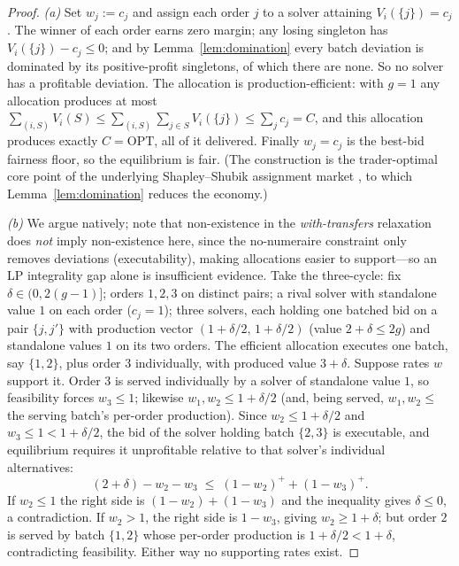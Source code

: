 \documentclass[11pt]{article}
\theoremstyle{remark}
\newcommand{\OPT}{\mathrm{OPT}}
\begin{document}
\begin{proof}
\emph{(a)} Set $w_j:=c_j$ and assign each order $j$ to a solver attaining
$V_i(\{j\})=c_j$. The winner of each order earns zero margin; any
losing singleton has $V_i(\{j\})-c_j\le0$; and by
Lemma~\ref{lem:domination} every batch deviation is dominated by its
positive-profit singletons, of which there are none. So no solver has a
profitable deviation. The allocation is production-efficient: with $g=1$
any allocation produces at most
$\sum_{(i,S)}V_i(S)\le\sum_{(i,S)}\sum_{j\in S}V_i(\{j\})\le
\sum_jc_j=C$, and this allocation produces exactly $C=\OPT$, all of it
delivered. Finally $w_j=c_j$ is the best-bid fairness floor, so the
equilibrium is fair. (The construction is the trader-optimal core point of
the underlying Shapley--Shubik assignment market \cite{shapley1971},
to which Lemma~\ref{lem:domination} reduces the economy.)

\emph{(b)} We argue natively; note that non-existence in the
\emph{with-transfers} relaxation does \emph{not} imply non-existence
here, since the no-numeraire constraint only removes deviations
(executability), making allocations easier to support---so an LP
integrality gap alone is insufficient evidence. Take the three-cycle: fix
$\delta\in(0,2(g-1)]$; orders $1,2,3$ on distinct pairs; a rival solver
with standalone value $1$ on each order ($c_j=1$); three solvers, each
holding one batched bid on a pair $\{j,j'\}$ with production vector
$(1+\delta/2,\,1+\delta/2)$ (value $2+\delta\le2g$) and standalone values
$1$ on its two orders. The efficient allocation executes one batch, say
$\{1,2\}$, plus order $3$ individually, with produced value $3+\delta$.
Suppose rates $w$ support it. Order $3$ is served individually by a
solver of standalone value $1$, so feasibility forces $w_3\le1$; likewise
$w_1,w_2\le1+\delta/2$ (and, being served, $w_1,w_2\le$ the serving
batch's per-order production). Since $w_2\le1+\delta/2$ and
$w_3\le1<1+\delta/2$, the bid of the solver holding batch $\{2,3\}$
is executable, and equilibrium requires it unprofitable relative to that
solver's individual alternatives:
\[
(2+\delta)-w_2-w_3\;\le\;(1-w_2)^++(1-w_3)^+ .
\]
If $w_2\le 1$ the right side is $(1-w_2)+(1-w_3)$ and the inequality
gives $\delta\le0$, a contradiction. If $w_2>1$, the right side is
$1-w_3$, giving $w_2\ge1+\delta$; but order $2$ is served by batch
$\{1,2\}$ whose per-order production is $1+\delta/2<1+\delta$,
contradicting feasibility. Either way no supporting rates exist.
\end{proof}
\end{document}
